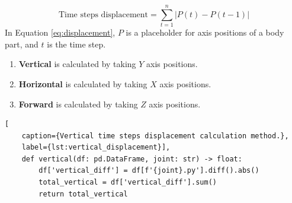                 \begin{equation} \label{eq:displacement}
                    \text{Time steps displacement} = \sum_{t=1}^{n} \left| P(t) - P(t-1) \right|
                \end{equation}
                In Equation \ref{eq:displacement}, $P$ is a placeholder for axis positions of a body part, and $t$ is the time step. 
                \begin{enumerate}
                    \item \textbf{Vertical} is calculated by taking $Y$ axis positions.
                    \item \textbf{Horizontal} is calculated by taking $X$ axis positions.
                    \item \textbf{Forward} is calculated by taking $Z$ axis positions.
                \end{enumerate}
               
        \begin{lstlisting}[
    caption={Vertical time steps displacement calculation method.}, 
    label={lst:vertical_displacement}],     
    def vertical(df: pd.DataFrame, joint: str) -> float:
        df['vertical_diff'] = df[f'{joint}.py'].diff().abs()
        total_vertical = df['vertical_diff'].sum()
        return total_vertical
        \end{lstlisting}

\cleardoublepage